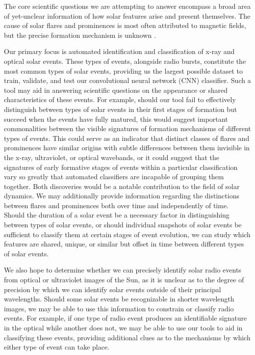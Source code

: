 \documentclass[12pt, letterpaper]{article}
\begin{document}
The core scientific questions we are attempting to answer encompass a broad area of yet-unclear information of how solar features arise and present themselves. The cause of solar flares and prominences is most often attributed to magnetic fields, but the precise formation mechanism is unknown \cite{BOB}. 

Our primary focus is automated identification and classification of x-ray and optical solar events. These types of events, alongside radio bursts, constitute the most common types of solar events, providing us the largest possible dataset to train, validate, and test our convolutional neural network (CNN) classifier. Such a tool may aid in answering scientific questions on the appearance or shared characteristics of these events. For example, should our tool fail to effectively distinguish between types of solar events in their first stages of formation but succeed when the events have fully matured, this would suggest important commonalities between the visible signatures of formation mechanisms of different types of events. This could serve as an indicator that distinct classes of flares and prominences have similar origins with subtle differences between them invisible in the x-ray, ultraviolet, or optical wavebands, or it could suggest that the signatures of early formative stages of events within a particular classification vary so greatly that automated classifiers are incapable of grouping them together. Both discoveries would be a notable contribution to the field of solar dynamics. We may additionally provide information regarding the distinctions between flares and prominences both over time and independently of time. Should the duration of a solar event be a necessary factor in distinguishing between types of solar events, or should individual snapshots of solar events be sufficient to classify them at certain stages of event evolution, we can study which features are shared, unique, or similar but offset in time between different types of solar events. 

We also hope to determine whether we can precisely identify solar radio events from optical or ultraviolet images of the Sun, as it is unclear as to the degree of precision by which we can identify solar events outside of their principal wavelengths. Should some solar events be recognizable in shorter wavelength images, we may be able to use this information to constrain or classify radio events. For example, if one type of radio event produces an identifiable signature in the optical while another does not, we may be able to use our tools to aid in classifying these events, providing additional clues as to the mechanisms by which either type of event can take place.
\end{document}
